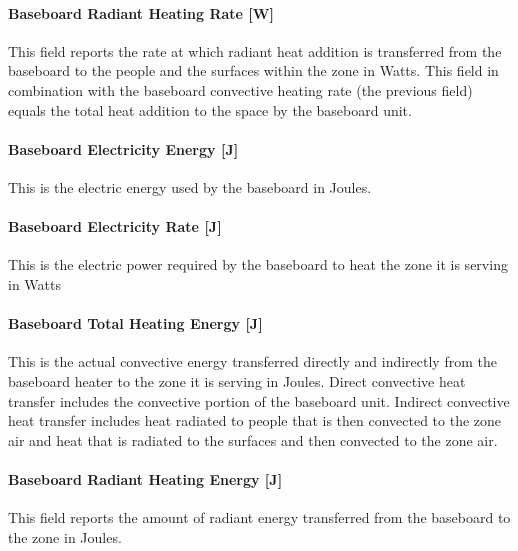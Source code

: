 \paragraph{Baseboard Radiant Heating Rate {[}W{]}}\label{baseboard-radiant-heating-rate-w-2}

This field reports the rate at which radiant heat addition is transferred from the baseboard to the people and the surfaces within the zone in Watts.  This field in combination with the baseboard convective heating rate (the previous field) equals the total heat addition to the space by the baseboard unit.

\paragraph{Baseboard Electricity Energy {[}J{]}}\label{baseboard-electric-energy-j-000}

This is the electric energy used by the baseboard in Joules.

\paragraph{Baseboard Electricity Rate {[}J{]}}\label{baseboard-electric-power-j}

This is the electric power required by the baseboard to heat the zone it is serving in Watts

\paragraph{Baseboard Total Heating Energy {[}J{]}}\label{baseboard-total-heating-energy-j-2}

This is the actual convective energy transferred directly and indirectly from the baseboard heater to the zone it is serving in Joules. Direct convective heat transfer includes the convective portion of the baseboard unit. Indirect convective heat transfer includes heat radiated to people that is then convected to the zone air and heat that is radiated to the surfaces and then convected to the zone air.

\paragraph{Baseboard Radiant Heating Energy {[}J{]}}\label{baseboard-radiant-heating-energy-j-2}

This field reports the amount of radiant energy transferred from the baseboard to the zone in Joules.

